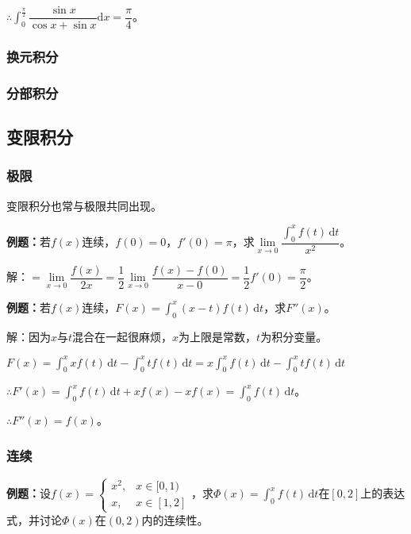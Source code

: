 \documentclass[UTF8, 12pt]{ctexart}
\begin{document}
$\therefore\displaystyle{\int_0^\frac{\pi}{2}\dfrac{\sin x}{\cos x+\sin x}\textrm{d}x}=\dfrac{\pi}{4}$。

\subsubsection{换元积分}

\subsubsection{分部积分}

\subsection{变限积分}

\subsubsection{极限}

变限积分也常与极限共同出现。

\textbf{例题：}若$f(x)$连续，$f(0)=0$，$f'(0)=\pi$，求$\lim\limits_{x\to0}\dfrac{\int_0^xf(t)\,\textrm{d}t}{x^2}$。

解：$=\lim\limits_{x\to0}\dfrac{f(x)}{2x}=\dfrac{1}{2}\lim\limits_{x\to0}\dfrac{f(x)-f(0)}{x-0}=\dfrac{1}{2}f'(0)=\dfrac{\pi}{2}$。

\textbf{例题：}若$f(x)$连续，$F(x)=\int_0^x(x-t)f(t)\,\textrm{d}t$，求$F''(x)$。

解：因为$x$与$t$混合在一起很麻烦，$x$为上限是常数，$t$为积分变量。

$F(x)=\int_0^xxf(t)\,\textrm{d}t-\int_0^xtf(t)\,\textrm{d}t=x\int_0^xf(t)\,\textrm{d}t-\int_0^xtf(t)\,\textrm{d}t$

$\therefore F'(x)=\int_0^xf(t)\,\textrm{d}t+xf(x)-xf(x)=\int_0^xf(t)\,\textrm{d}t$。

$\therefore F''(x)=f(x)$。

\subsubsection{连续}

\textbf{例题：}设$f(x)=\left\{\begin{array}{ll}
    x^2, & x\in[0,1) \\
    x, & x\in[1,2]
\end{array}\right.$，求$\varPhi(x)=\int_0^xf(t)\,\textrm{d}t$在$[0,2]$上的表达式，并讨论$\varPhi(x)$在$(0,2)$内的连续性。
\end{document}
